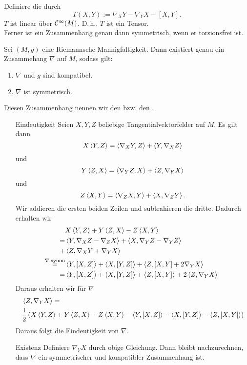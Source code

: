 \Bem{}
Definiere die  durch
\[ T(X,Y) := \nabla_{X}Y - \nabla_{Y}X - [X,Y]. \]
$T$ ist linear über $\mathcal{C}^{\infty}(M)$. D.\,h., $T$ ist ein Tensor.\\
Ferner ist ein Zusammenhang genau dann symmetrisch, wenn er torsionsfrei ist.

Sei $(M,g)$ eine Riemannsche Mannigfaltigkeit. Dann existiert genau ein Zusammehang $\nabla$ auf $M$, sodass gilt:
\begin{enumerate}[1.)]
	\item $\nabla$ und $g$ sind kompatibel.
	\item $\nabla$ ist symmetrisch.
\end{enumerate}
Diesen Zusammenhang nennen wir den  bzw. den .

\begin{Beweis}{}
\begin{enumerate}[option]
	\item[Eindeutigkeit] Seien $X,Y,Z$ beliebige Tangentialvektorfelder auf $M$. Es gilt dann
	\[ X\left<Y,Z\right> = \left<\nabla_{X}Y, Z\right> + \left<Y, \nabla_{X} Z\right> \]
	und
	\[ Y\left<Z,X\right> = \left< \nabla_{Y} Z, X \right> + \left<Z, \nabla_{Y} X\right> \]
	und
	\[ Z\left<X,Y\right> = \left<\nabla_{Z}X, Y\right> + \left<X, \nabla_Z Y\right>. \]
	Wir addieren die ersten beiden Zeilen und subtrahieren die dritte. Dadurch erhalten wir
	\begin{align*}
	&X\left<Y,Z\right> + Y\left<Z,X\right> - Z \left<X,Y\right> \\
	=&
	\left<Y, \nabla_XZ - \nabla_ZX\right> + \left< X, \nabla_YZ - \nabla_YZ \right>\\
	+& \left<Z, \nabla_XY + \nabla_YX\right>\\
	\overset{\nabla \text{ symm}}{=}& \left<Y, [X,Z]\right> + \left<X, [Y,Z]\right> + \left<Z, [X,Y] + 2 \nabla_YX\right>\\
	=&  \left<Y, [X,Z]\right> + \left<X, [Y,Z]\right> + \left<Z, [X,Y] \right>+ 2 \left<Z,\nabla_YX\right>\
	\end{align*}
	Daraus erhalten wir für $\nabla$
	\begin{align*}
	&\left<Z,\nabla_YX\right> =\\
	 &\frac{1}{2} \left(
		X\left<Y,Z\right> + Y\left<Z,X\right> - Z\left<X,Y\right> - \left<Y,[X,Z]\right> - \left<X, [Y,Z]\right> - \left<Z, [X,Y]\right>
	\right)
	\end{align*}
Daraus folgt die Eindeutigkeit von $\nabla$.
\item[Existenz] Definiere $\nabla_YX$ durch obige Gleichung. Dann bleibt nachzurechnen, dass $\nabla$ ein symmetrischer und kompatibler Zusammenhang ist.
\end{enumerate}
\end{Beweis}